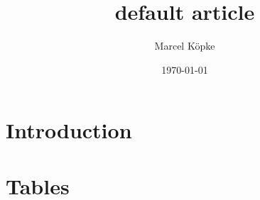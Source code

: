 \documentclass[a4paper, 12pt]{article}
\title{default article}
\author{Marcel Köpke}
\date{\today}
\begin{document}
\maketitle

\tableofcontents


\section{Introduction}
\label{sec:introduction}


\clearpage
\section{Tables}
\label{sec:tables}



\clearpage
\printbibliography
\end{document}
